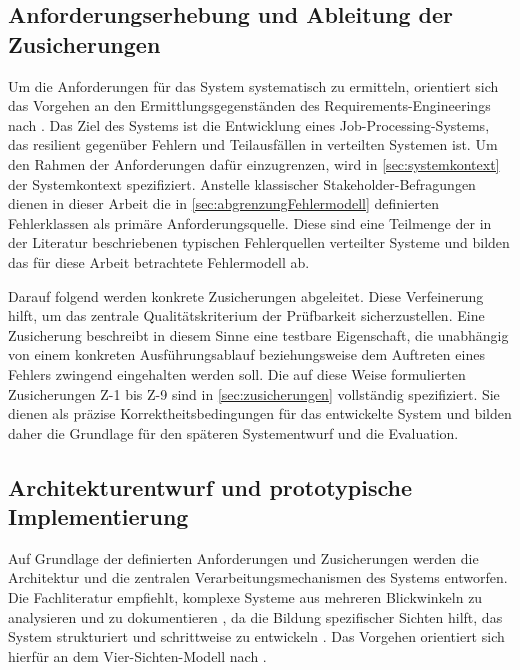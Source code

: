 \subsection{Anforderungserhebung und Ableitung der Zusicherungen}
\label{subsec:anforderungserhebung}
Um die Anforderungen für das System systematisch zu ermitteln, orientiert sich das Vorgehen an den Ermittlungsgegenständen des
Requirements-Engineerings nach \textcite{rupp_requirements-engineering_2021}.
Das Ziel des Systems ist die Entwicklung eines Job-Processing-Systems, das resilient gegenüber Fehlern und Teilausfällen in
verteilten Systemen ist.
Um den Rahmen der Anforderungen dafür einzugrenzen, wird in \cref{sec:systemkontext} der Systemkontext spezifiziert.
Anstelle klassischer Stakeholder-Befragungen dienen in dieser Arbeit die in \cref{sec:abgrenzungFehlermodell}
definierten Fehlerklassen als primäre Anforderungsquelle.
Diese sind eine Teilmenge der in der Literatur beschriebenen typischen Fehlerquellen verteilter Systeme und bilden das für
diese Arbeit betrachtete Fehlermodell ab.

Darauf folgend werden konkrete Zusicherungen abgeleitet.
Diese Verfeinerung hilft, um das zentrale Qualitätskriterium der Prüfbarkeit sicherzustellen.
Eine Zusicherung beschreibt in diesem Sinne eine testbare Eigenschaft, die unabhängig von einem konkreten
Ausführungsablauf beziehungsweise dem Auftreten eines Fehlers zwingend eingehalten werden soll.
Die auf diese Weise formulierten Zusicherungen Z-1 bis Z-9 sind in \cref{sec:zusicherungen} vollständig spezifiziert.
Sie dienen als präzise Korrektheitsbedingungen für das entwickelte System und bilden daher die Grundlage für
den späteren Systementwurf und die Evaluation.

\subsection{Architekturentwurf und prototypische Implementierung}
\label{subsec:architekturentwurfUndImplementierung}
Auf Grundlage der definierten Anforderungen und Zusicherungen werden die Architektur und die zentralen
Verarbeitungsmechanismen des Systems entworfen.
Die Fachliteratur empfiehlt, komplexe Systeme aus mehreren Blickwinkeln zu analysieren und zu dokumentieren \parencite[S.470]{rupp_requirements-engineering_2021},
da die Bildung spezifischer Sichten hilft, das System strukturiert und schrittweise zu entwickeln \parencite[S.469]{rupp_requirements-engineering_2021}.
Das Vorgehen orientiert sich hierfür an dem Vier-Sichten-Modell nach \textcite[S.80 ff.]{starke_effektive_2024}.

